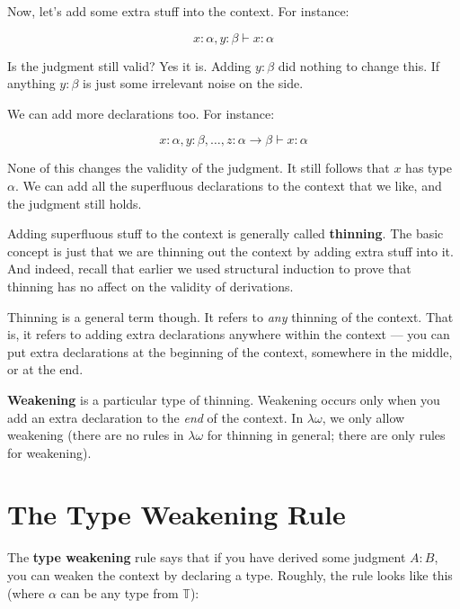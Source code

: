\documentclass{book}
\numberwithin{equation}{chapter}
\newcommand{\vocab}{\textbf}
\begin{document}
Now, let's add some extra stuff into the context. For instance:

\begin{equation}
x : \alpha, y : \beta \vdash x : \alpha
\end{equation}

\noindent
Is the judgment still valid? Yes it is. Adding $y : \beta$ did nothing to change this. If anything $y : \beta$ is just some irrelevant noise on the side. 

We can add more declarations too. For instance:

\begin{equation}
x : \alpha, y : \beta, \ldots, z : \alpha \rightarrow \beta \vdash x : \alpha
\end{equation}

\noindent
None of this changes the validity of the judgment. It still follows that $x$ has type $\alpha$. We can add all the superfluous declarations to the context that we like, and the judgment still holds.

Adding superfluous stuff to the context is generally called \vocab{thinning}. The basic concept is just that we are thinning out the context by adding extra stuff into it. And indeed, recall that earlier we used structural induction to prove that thinning has no affect on the validity of derivations.

Thinning is a general term though. It refers to \textit{any} thinning of the context. That is, it refers to adding extra declarations anywhere within the context --- you can put extra declarations at the beginning of the context, somewhere in the middle, or at the end. 

\vocab{Weakening} is a particular type of thinning. Weakening occurs only when you add an extra declaration to the \textit{end} of the context. In $\lambda\omega$, we only allow weakening (there are no rules in $\lambda\omega$ for thinning in general; there are only rules for weakening).



\section{The Type Weakening Rule}

The \vocab{type weakening} rule says that if you have derived some judgment $A : B$, you can weaken the context by declaring a type. Roughly, the rule looks like this (where $\alpha$ can be any type from $\mathbb{T}$):
\end{document}
